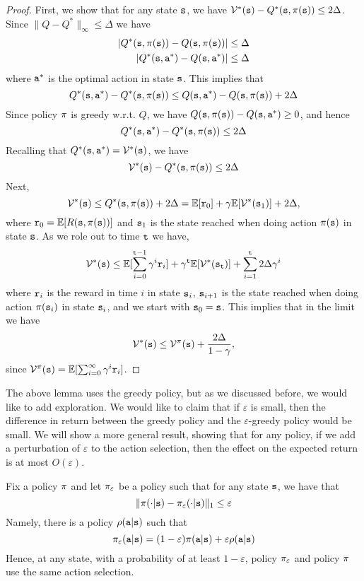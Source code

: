 \begin{proof}
First, we show that for any state ${\tt s}$, we have
$\mathcal{V}^*({\tt s})-Q^*({\tt s},\pi({\tt s}))\leq 2\Delta$. 
Since
$\| Q-Q^*\|_\infty \leq \Delta$ we have
\begin{align*}
|Q^{*}({\tt s},\pi({\tt s}))-Q({\tt s},\pi({\tt s}))| & \leq\Delta\\
|Q^{*}({\tt s},{\tt a}^{*})-Q({\tt s},{\tt a}^{*})| & \leq\Delta
\end{align*}
where ${\tt a}^*$ is the optimal action in state ${\tt s}$. This implies that
\[Q^*({\tt s},{\tt a}^*)-Q^*({\tt s},\pi({\tt s}))\leq
Q({\tt s},{\tt a}^*)-Q({\tt s},\pi({\tt s}))+2\Delta\]
Since policy $\pi$ is greedy w.r.t. $Q$, we have
$Q({\tt s},\pi({\tt s})) - Q({\tt s},{\tt a}^*) \geq 0$, and hence
\[Q^*({\tt s},{\tt a}^*)-Q^*({\tt s},\pi({\tt s}))\leq
2\Delta\]
Recalling that $Q^*({\tt s},{\tt a}^*) = \mathcal{V}^*({\tt s})$, we have
\[\mathcal{V}^*({\tt s})-Q^*({\tt s},\pi({\tt s})) \leq 2\Delta\]
Next,
$$\mathcal{V}^*({\tt s})\leq Q^*({\tt s},\pi({\tt s}))+2\Delta = \mathbb{E}[{\tt r}_0]+\gamma
\mathbb{E}[\mathcal{V}^*({\tt s}_1)]+2\Delta,$$ where
${\tt r}_0=\mathbb{E}[R({\tt s},\pi({\tt s}))]$ and ${\tt s}_1$ is the state
reached when doing action $\pi({\tt s})$ in state ${\tt s}$. As we
role out to time ${\tt t}$ we have,
\[
\mathcal{V}^*({\tt s})\leq \mathbb{E}[\sum_{i=0}^{{\tt t}-1} \gamma^i
{\tt r}_i]+\gamma^{\tt t}
\mathbb{E}[\mathcal{V}^*({\tt s}_{\tt t})]+\sum_{i=1}^{\tt t} 2\Delta\gamma^i
\]
where ${\tt r}_i$ is the reward in time $i$ in state ${\tt s}_i$,
${\tt s}_{i+1}$ is the state reached when doing action
$\pi({\tt s}_i)$ in state ${\tt s}_i$, and we start with
${\tt s}_0={\tt s}$.
%
This implies that in the limit we have
\[
\mathcal{V}^*({\tt s})\leq \mathcal{V}^\pi({\tt s})+\frac{
2\Delta}{1-\gamma},
\]
since $\mathcal{V}^\pi({\tt s})=\mathbb{E}[\sum_{i=0}^{\infty} \gamma^i
{\tt r}_i]$.
\end{proof}

The above lemma uses the greedy policy, but as we discussed before,
we would like to add exploration. We would like to claim that if
$\varepsilon$ is small, then the difference in return between the
greedy policy and the $\varepsilon$-greedy policy would be small. We
will show a more general result, showing that for any policy, if we
add a perturbation of $\varepsilon$ to the action selection, then
the effect on the expected return is at most $O(\varepsilon)$.

Fix a policy $\pi$ and let $\pi_\varepsilon$ be a policy
such that for any state ${\tt s}$, we have that
\[\|\pi(\cdot|{\tt s})-\pi_\varepsilon(\cdot|{\tt s})\|_1\leq\varepsilon\]
Namely, there is a policy $\rho({\tt a}|{\tt s})$ such that
\[\pi_\varepsilon({\tt a}|{\tt s})=(1-\varepsilon)\pi({\tt a}|{\tt s})+\varepsilon
\rho({\tt a}|{\tt s})\]
Hence, at any state, with a probability of at least $1-\varepsilon$, policy $\pi_\varepsilon$ and policy
$\pi$ use the same action selection.

